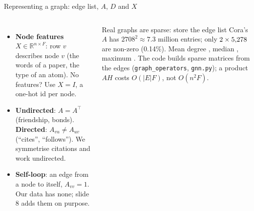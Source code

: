 \documentclass[aspectratio=169,10pt]{beamer}
\newcommand{\R}{\mathbb{R}}
\newcommand{\T}{\top}
\newcommand{\key}[1]{\textbf{\color{cAtt}#1}}
\begin{document}
\begin{frame}{Representing a graph: edge list, $A$, $D$ and $X$}
\begin{columns}[T,onlytextwidth]
\begin{itemize}
  \item \key{Node features} $X\in\R^{n\times F}$: row $v$ describes node $v$ (the words of a paper,
        the type of an atom). No features? Use $X=I$, a one-hot id per node.
  \item \textbf{Undirected}: $A=A^\T$ (friendship, bonds). \textbf{Directed}: $A_{vu}\ne A_{uv}$
        (``cites'', ``follows''). We symmetrise citations and work undirected.
  \item \key{Self-loop}: an edge from a node to itself, $A_{vv}=1$. Our data has none;
        slide 8 adds them on purpose.
\end{itemize}
\vspace{-1mm}
\begin{block}{Real graphs are sparse: store the edge list}
\footnotesize
Cora's $A$ has $2708^2\approx7.3$ million entries; only $2\times5{,}278$ are non-zero (0.14\%).
Mean degree \coraMeanDeg, median \coraMedianDeg, maximum \coraMaxDeg. The code builds sparse matrices from
the edges (\texttt{graph\_operators}, \texttt{gnn.py}); a product $AH$ costs $O(|E|F)$, not $O(n^2F)$.
\end{block}
\end{columns}
\end{frame}
\end{document}
